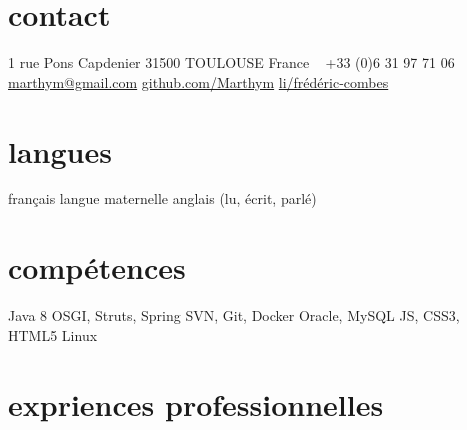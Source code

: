 \documentclass{friggeri-cv} 	%
\begin{document}


\begin{aside} %
\section{contact}
1 rue Pons Capdenier
31500 TOULOUSE
France
~
+33 (0)6 31 97 71 06
\href{mailto:marthym@gmail.com}{marthym@gmail.com}
\href{https://github.com/Marthym}{github.com/Marthym}
\href{https://fr.linkedin.com/pub/frédéric-combes/91/820/108/}{li/frédéric-combes}
\section{langues}
français langue maternelle
anglais (lu, écrit, parlé)
\section{compétences}
Java 8
OSGI, Struts, Spring
SVN, Git, Docker
Oracle, MySQL
JS, CSS3, HTML5
Linux
\end{aside}

\section{expriences professionnelles}
\end{document}
